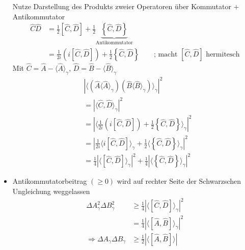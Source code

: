 \documentclass[10pt,article,colorback,accentcolor=tud9d]{scrartcl}
\begin{document}
\begin{itemize}
\begin{equation}
      \end{equation}
      Nutze Darstellung des Produkts zweier Operatoren über Kommutator $+$ Antikommutator
      \begin{equation}
      \begin{aligned}
        \hat{C}\hat{D}&=\frac{1}{2}\left[\hat{C},\hat{D}\right]+\frac{1}{2}\underbrace{\left\{\hat{C},\hat{D}\right\}}_{\text{Antikommutator}}\\
        &=\frac{1}{2i}\left(i\left[\hat{C},\hat{D}\right]\right)+\frac{1}{2}\left\{\hat{C},\hat{D}\right\} \quad \quad \text{; macht $\left[\hat{C},\hat{D}\right]$ hermitesch}
      \end{aligned}
      \end{equation}
      Mit $\hat{C}=\hat{A}-\langle\hat{A}\rangle_\gamma$, $\hat{D}=\hat{B}-\langle\hat{B}\rangle_\gamma$
      \begin{equation}
      \begin{aligned}
        &\left|\langle\left(\hat{A}\langle\hat{A}\rangle_\gamma\right)\left(\hat{B}\langle\hat{B}\rangle_\gamma\right)\rangle_\gamma\right|^2\\
        &=\left|\langle\hat{C},\hat{D}\rangle_\gamma\right|^2\\
        &=\left|\langle\frac{1}{2i}\left(i\left[\hat{C},\hat{D}\right]\right)+\frac{1}{2}\left\{\hat{C},\hat{D}\right\}\rangle_\gamma\right|^2\\
        &=\left|\frac{1}{2i}\langle i\left[\hat{C},\hat{D}\right]\rangle_\gamma+\frac{1}{2}\langle\left\{\hat{C},\hat{D}\right\}\rangle_\gamma\right|^2\\
        &=\frac{1}{4}\left|\langle\left[\hat{C},\hat{D}\right]\rangle_\gamma\right|^2+\frac{1}{4}\left|\langle\left\{\hat{C},\hat{D}\right\}\rangle_\gamma\right|^2
      \end{aligned}
      \end{equation}
    \item Antikommutatorbeitrag $(\geq 0)$ wird auf rechter Seite der Schwarzschen Ungleichung weggelassen
      \begin{equation}
      \begin{aligned}
        \Delta A_\gamma^2 \Delta B_\gamma^2 &\geq \frac{1}{4}\left|\langle\left[\hat{C},\hat{D}\right]\rangle_\gamma\right|^2\\
        &=\frac{1}{4}\left|\langle\left[\hat{A},\hat{B}\right]\rangle_\gamma\right|^2\\
        \Rightarrow \Delta A_\gamma \Delta B_\gamma &\geq \frac{1}{2}\left|\langle\left[\hat{A},\hat{B}\right]\rangle\right|
      \end{aligned}
      \end{equation}
  \end{itemize}
\end{document}
